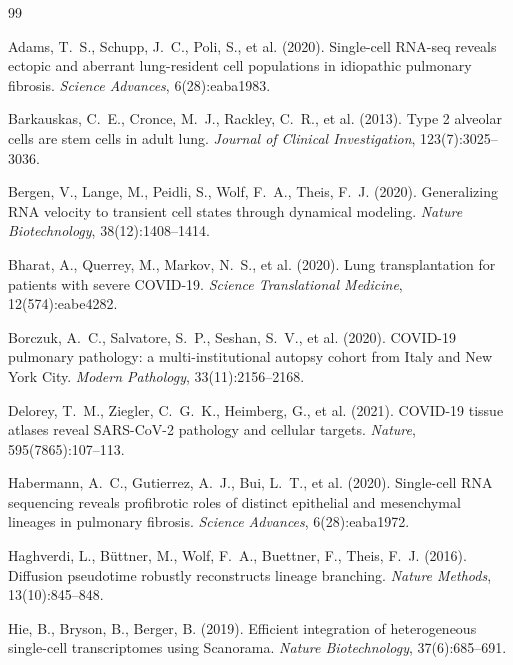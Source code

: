 \documentclass[11pt]{article}
\begin{document}
\begin{thebibliography}{99}
\small

Adams, T.~S., Schupp, J.~C., Poli, S., et al. (2020).
Single-cell RNA-seq reveals ectopic and aberrant lung-resident cell populations in idiopathic pulmonary fibrosis.
\textit{Science Advances}, 6(28):eaba1983.

Barkauskas, C.~E., Cronce, M.~J., Rackley, C.~R., et al. (2013).
Type 2 alveolar cells are stem cells in adult lung.
\textit{Journal of Clinical Investigation}, 123(7):3025--3036.

Bergen, V., Lange, M., Peidli, S., Wolf, F.~A., Theis, F.~J. (2020).
Generalizing RNA velocity to transient cell states through dynamical modeling.
\textit{Nature Biotechnology}, 38(12):1408--1414.

Bharat, A., Querrey, M., Markov, N.~S., et al. (2020).
Lung transplantation for patients with severe COVID-19.
\textit{Science Translational Medicine}, 12(574):eabe4282.

Borczuk, A.~C., Salvatore, S.~P., Seshan, S.~V., et al. (2020).
COVID-19 pulmonary pathology: a multi-institutional autopsy cohort from Italy and New York City.
\textit{Modern Pathology}, 33(11):2156--2168.

Delorey, T.~M., Ziegler, C.~G.~K., Heimberg, G., et al. (2021).
COVID-19 tissue atlases reveal SARS-CoV-2 pathology and cellular targets.
\textit{Nature}, 595(7865):107--113.

Habermann, A.~C., Gutierrez, A.~J., Bui, L.~T., et al. (2020).
Single-cell RNA sequencing reveals profibrotic roles of distinct epithelial and mesenchymal lineages in pulmonary fibrosis.
\textit{Science Advances}, 6(28):eaba1972.

Haghverdi, L., B\"{u}ttner, M., Wolf, F.~A., Buettner, F., Theis, F.~J. (2016).
Diffusion pseudotime robustly reconstructs lineage branching.
\textit{Nature Methods}, 13(10):845--848.

Hie, B., Bryson, B., Berger, B. (2019).
Efficient integration of heterogeneous single-cell transcriptomes using Scanorama.
\textit{Nature Biotechnology}, 37(6):685--691.


\end{thebibliography}
\end{document}
